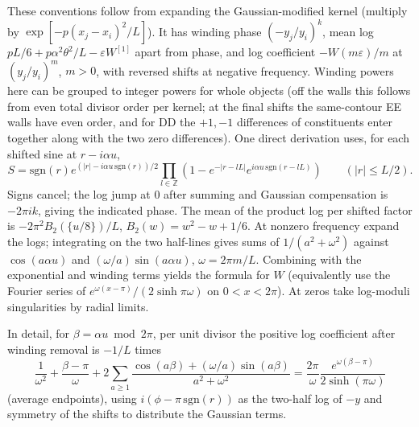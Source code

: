 These conventions follow from expanding the Gaussian-modified kernel (multiply by \(\exp[-p(x_j-x_i)^2/L]\)). It has winding phase \((-y_j/y_i)^k\), mean log \(p L/6+p\alpha^2\theta^2/L-\varepsilon W^{[1]}\) apart from phase, and log coefficient \(-W(m\varepsilon)/m\) at \((y_j/y_i)^m\), \(m>0\), with reversed shifts at negative frequency. Winding powers here can be grouped to integer powers for whole objects (off the walls this follows from even total divisor order per kernel; at the final shifts the same-contour EE walls have even order, and for DD the \(+1,-1\) differences of constituents enter together along with the two zero differences). One direct derivation uses, for each shifted sine at \(r-i\alpha u\),
\[
 S=\mathrm{sgn}(r)e^{(|r|-i\alpha u\,\mathrm{sgn}(r))/2}
 \prod_{l\in\mathbb Z}(1-e^{-|r-lL|} e^{i\alpha u\,\mathrm{sgn}(r-lL)})
 \qquad (|r|\le L/2).
\]
Signs cancel; the log jump at 0 after summing and Gaussian compensation is \(-2\pi i k\), giving the indicated phase. The mean of the product log per shifted factor is \(-2\pi^2 B_2(\{u/8\})/L\), \(B_2(w)=w^2-w+1/6\). At nonzero frequency expand the logs; integrating on the two half-lines gives sums of \(1/(a^2+\omega^2)\) against \(\cos(a\alpha u)\) and \((\omega/a)\sin(a\alpha u)\), \(\omega=2\pi m/L\). Combining with the exponential and winding terms yields the formula for \(W\) (equivalently use the Fourier series of \(e^{\omega(x-\pi)}/(2\sinh\pi\omega)\) on \(0<x<2\pi\)). At zeros take log-moduli singularities by radial limits.

In detail, for \(\beta=\alpha u\bmod 2\pi\), per unit divisor the positive log coefficient after winding removal is \(-1/L\) times
\[
 \frac1{\omega^2}+\frac{\beta-\pi}{\omega}
 +2\sum_{a\ge1}\frac{\cos(a\beta)+(\omega/a)\sin(a\beta)}{a^2+\omega^2}
 =\frac{2\pi}{\omega}\frac{e^{\omega(\beta-\pi)}}{2\sinh(\pi\omega)}
\]
(average endpoints), using \(i(\phi-\pi\,\mathrm{sgn}(r))\) as the two-half log of \(-y\) and symmetry of the shifts to distribute the Gaussian terms.

